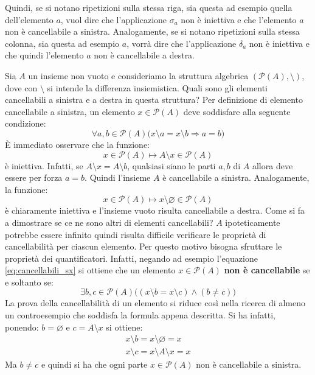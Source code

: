 Quindi, se si notano ripetizioni sulla stessa riga, sia questa ad esempio quella dell'elemento $a$, vuol dire che l'applicazione $\sigma_{a}$ non è iniettiva e che l'elemento $a$ non è cancellabile a sinistra. Analogamente, se si notano ripetizioni sulla stessa colonna, sia questa ad esempio $a$, vorrà dire che l'applicazione $\delta_{a}$ non è iniettiva e che quindi l'elemento $a$ non è cancellabile a destra.

\begin{example}	
	Sia $A$ un insieme non vuoto e consideriamo la struttura algebrica $(\mathcal{P}(A),\setminus)$, dove con $\setminus$ si intende la differenza insiemistica. Quali sono gli elementi cancellabili a sinistra e a destra in questa struttura? Per definizione di elemento cancellabile a sinistra, un elemento $x \in \mathcal{P}(A)$ deve soddisfare alla seguente condizione:
	\begin{displaymath}
		\forall a,b \in \mathcal{P}(A) \bigl(x \setminus a = x \setminus b \Rightarrow a=b \bigr)
	\end{displaymath}
	È immediato osservare che la funzione:
	\begin{displaymath}
		x \in \mathcal{P}(A) \mapsto A \setminus x \in \mathcal{P}(A)
	\end{displaymath}
	è iniettiva. Infatti, se $A \setminus x = A \setminus b$, qualsiasi siano le parti $a,b$ di $A$ allora deve essere per forza $a=b$. Quindi l'insieme $A$ è cancellabile a sinistra. Analogamente, la funzione:
	\begin{displaymath}
		x \in \mathcal{P}(A) \mapsto x \setminus \varnothing \in \mathcal{P}(A)
	\end{displaymath}
	è chiaramente iniettiva e l'insieme vuoto risulta cancellabile a destra. Come si fa a dimostrare se ce ne sono altri di elementi cancellabili? $A$ ipoteticamente potrebbe essere infinito quindi risulta difficile verificare le proprietà di cancellabilità per ciascun elemento. Per questo motivo bisogna sfruttare le proprietà dei quantificatori. Infatti, negando ad esempio l'equazione \ref{eq:cancellabili_sx} si ottiene che un elemento $x \in \mathcal{P}(A)$ \textbf{non è cancellabile} se e soltanto se:
	\begin{displaymath}
		\exists b,c \in \mathcal{P}(A) \bigl( (x \setminus b = x \setminus c) \wedge (b \neq c) \bigr)
	\end{displaymath}
	La prova della cancellabilità di un elemento si riduce così nella ricerca di almeno un controesempio che soddisfa la formula appena descritta. Si ha infatti, ponendo: $b= \varnothing$ e  $c=A \setminus x$ si ottiene:
	\begin{displaymath}
		\begin{array}{l}
			x \setminus b = x \setminus \varnothing = x \\
			x \setminus c = x \setminus A \setminus x = x
		\end{array}
	\end{displaymath}
	Ma $b \neq c$ e quindi si ha che ogni parte $x \in \mathcal{P}(A)$ non è cancellabile a sinistra.
\end{example}


